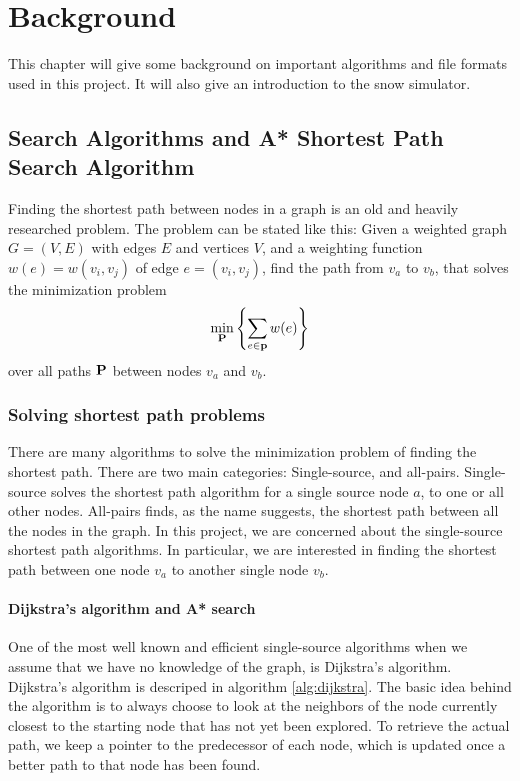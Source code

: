 \chapter{Background}
\label{chap:background}
This chapter will give some background on important algorithms and file formats used in this project. It will also give an introduction to the snow simulator.

\section{Search Algorithms and A* Shortest Path Search Algorithm}
Finding the shortest path between nodes in a graph is an old and heavily researched problem. The problem can be stated like this: Given a weighted graph $G = (V,E)$ with edges $E$ and vertices $V$, and a weighting function $w(e) = w(v_i, v_j)$ of edge $e = (v_i, v_j)$, find the path from $v_a$ to $v_b$, that solves the minimization problem
\begin{equation}
\min_{\mathbf P} \left\{ \sum_{e\in \mathbf{p}} w(e) \right\}
\end{equation}
over all paths $\mathbf P$ between nodes $v_a$ and $v_b$.\cite{shortestpath}

\subsection{Solving shortest path problems}
\label{sec:solving_shortest_path}
There are many algorithms to solve the minimization problem of finding the shortest path. There are two main categories: Single-source, and all-pairs. Single-source solves the shortest path algorithm for a single source node $a$, to one or all other nodes. All-pairs finds, as the name suggests, the shortest path between all the nodes in the graph. In this project, we are concerned about the single-source shortest path algorithms. In particular, we are interested in finding the shortest path between one node $v_a$ to another single node $v_b$.

\subsubsection{Dijkstra's algorithm and A* search}
One of the most well known and efficient single-source algorithms when we assume that we have no knowledge of the graph, is Dijkstra's algorithm. Dijkstra's algorithm is descriped in algorithm \ref{alg:dijkstra}. The basic idea behind the algorithm is to always choose to look at the neighbors of the node currently closest to the starting node that has not yet been explored. To retrieve the actual path, we keep a pointer to the predecessor of each node, which is updated once a better path to that node has been found. 

